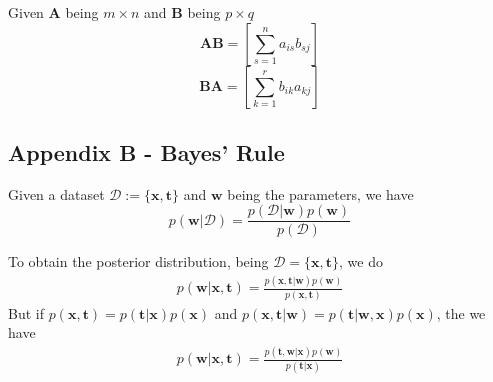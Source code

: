 \begin{frame}{\insertsubsection}

\begin{definition}
Given $\mathbf{A}$ being $m \times n$ and $\mathbf{B}$ being $p \times q$
\begin{equation*}
\mathbf{A}\mathbf{B} = \left[ \sum^n_{s=1} a_{is}b_{sj} \right]
\end{equation*}
\begin{equation*}
\mathbf{B}\mathbf{A} = \left[ \sum^r_{k=1} b_{ik}a_{kj} \right]
\end{equation*}
\end{definition}

\end{frame}

\subsection{Appendix B - Bayes' Rule}

\begin{frame}{\insertsubsection}

\begin{definition}
Given a dataset $\mathcal{D} := \{ \mathbf{x},\mathbf{t} \}$ and $\mathbf{w}$ being the parameters, we have
\begin{equation*}
p(\mathbf{w}| \mathcal{D}) = \frac{p(\mathcal{D}|\mathbf{w}) p(\mathbf{w})}{p(\mathcal{D})}
\end{equation*}
\end{definition}

\end{frame}

\begin{frame}{\insertsubsection}
    To obtain the posterior distribution, being $\mathcal{D} = \{ \mathbf{x}, \mathbf{t} \}$, we do
    \begin{align*}
        p(\mathbf{w}|\mathbf{x},\mathbf{t}) = \frac{p( \mathbf{x}, \mathbf{t} | \mathbf{w}) p(\mathbf{w})}{p(\mathbf{x},\mathbf{t})}
    \end{align*}
    But if $p(\mathbf{x},\mathbf{t}) = p(\mathbf{t}|\mathbf{x}) p(\mathbf{x}) $ and $ p(\mathbf{x},\mathbf{t}|\mathbf{w}) = p(\mathbf{t}|\mathbf{w},\mathbf{x}) p(\mathbf{x}) $, the we have
    \begin{align*}
        p(\mathbf{w}|\mathbf{x},\mathbf{t}) = \frac{p( \mathbf{t}, \mathbf{w} | \mathbf{x}) p(\mathbf{w})}{p(\mathbf{t}|\mathbf{x})}
    \end{align*}
\end{frame}